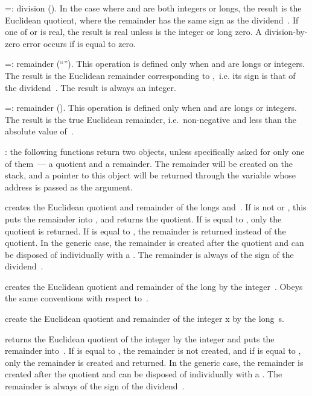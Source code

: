 \op=: division (). In the case where  and 
are both integers or longs, the result is the Euclidean quotient, where the
remainder has the same sign as the dividend~. If one of  or
 is real, the result is real unless  is the integer or long
zero. A division-by-zero error occurs if  is equal to zero.

\op=: remainder (``''). This operation is defined only
when  and  are longs or integers. The result is the Euclidean
remainder corresponding to ,~i.e. its sign is that of the
dividend~. The result is always an integer.

\op=: remainder (). This operation is defined only when
 and  are longs or integers. The result is the true Euclidean
remainder, i.e.~non-negative and less than the absolute value of~.

: the following functions return two objects,
unless specifically asked for only one of them~--- a quotient and a remainder.
The remainder will be created on the stack, and a  pointer to this
object will be returned through the variable whose address is passed as the
 argument.

 creates the Euclidean
quotient and remainder of the longs  and~. If  is not
 or , this puts the remainder into ,
and returns the quotient. If  is equal to , only the
quotient is returned. If  is equal to , the remainder
is returned instead of the quotient. In the generic case, the remainder is
created after the quotient and can be disposed of individually with a
. The remainder is always of the sign of the dividend~.

 creates the Euclidean
quotient and remainder of the long  by the integer~.
Obeys the same conventions with respect to~.

 create the Euclidean
quotient and remainder of the integer x by the long~s.

 returns the Euclidean quotient
of the integer  by the integer  and puts the remainder
into~. If  is equal to , the remainder is not
created, and if  is equal to  , only the remainder
is created and returned. In the generic case, the remainder is created
after the quotient and can be disposed of individually with a .
The remainder is always of the sign of the dividend~.

